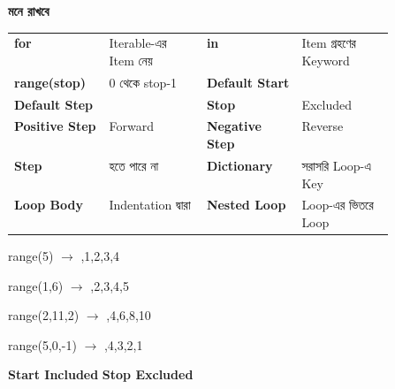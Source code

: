 \begin{rememberbox}

\textbf{\color{deepOrange}মনে রাখবে}

\begin{tabularx}
{\linewidth}
{
>{\bfseries\RaggedRight\arraybackslash}p{0.25\linewidth}
Y
>{\bfseries\RaggedRight\arraybackslash}p{0.25\linewidth}
Y
}

\textenglish{\ttfamily for}
&
Iterable-এর Item নেয়
&
\textenglish{\ttfamily in}
&
Item গ্রহণের Keyword
\\[0.7mm]

\textenglish{\ttfamily range(stop)}
&
0 থেকে stop-1
&
Default Start
&
\textenglish{}
\\[0.7mm]

Default Step
&
\textenglish{}
&
Stop
&
Excluded
\\[0.7mm]

Positive Step
&
Forward
&
Negative Step
&
Reverse
\\[0.7mm]

Step
&
\textenglish{}
হতে পারে না
&
Dictionary
&
সরাসরি Loop-এ Key
\\[0.7mm]

Loop Body
&
Indentation দ্বারা
&
Nested Loop
&
Loop-এর ভিতরে Loop
\\

\end{tabularx}

\medskip

\begin{center}

\textenglish{\ttfamily range(5)}
\(\longrightarrow\)
\textenglish{,1,2,3,4}

\medskip

\textenglish{\ttfamily range(1,6)}
\(\longrightarrow\)
\textenglish{,2,3,4,5}

\medskip

\textenglish{\ttfamily range(2,11,2)}
\(\longrightarrow\)
\textenglish{,4,6,8,10}

\medskip

\textenglish{\ttfamily range(5,0,-1)}
\(\longrightarrow\)
\textenglish{,4,3,2,1}

\medskip

\textbf{Start Included}
\qquad
\textbf{Stop Excluded}

\end{center}

\end{rememberbox}

\small


